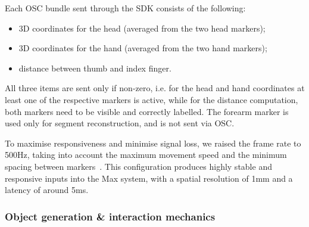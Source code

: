 \documentclass{nime-alternate}
\begin{document}
Each OSC bundle sent through the SDK consists of the following:
\begin{itemize}
	\item 3D coordinates for the head (averaged from the two head markers);
	\item 3D coordinates for the hand (averaged from the two hand markers);
	\item distance between thumb and index finger.
\end{itemize}

All three items are sent only if non-zero, i.e. for the head and hand coordinates at least one of the respective markers is active, while for the distance computation, both markers need to be visible and correctly labelled. The forearm marker is used only for segment reconstruction, and is not sent via OSC.



To maximise responsiveness and minimise signal loss, we raised the frame rate to 500Hz, taking into account the maximum movement speed and the minimum spacing between markers~\cite{song2016fast}. This configuration produces highly stable and responsive inputs into the Max system, with a spatial resolution of 1mm and a latency of around 5ms.

\subsubsection{Object generation \& interaction mechanics}
\end{document}
